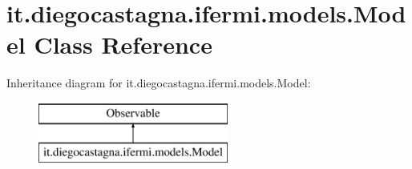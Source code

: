 \hypertarget{classit_1_1diegocastagna_1_1ifermi_1_1models_1_1_model}{}\section{it.\+diegocastagna.\+ifermi.\+models.\+Model Class Reference}
\label{classit_1_1diegocastagna_1_1ifermi_1_1models_1_1_model}
Inheritance diagram for it.\+diegocastagna.\+ifermi.\+models.\+Model\+:\begin{figure}[H]
\begin{center}
\leavevmode
\includegraphics[height=2.000000cm]{classit_1_1diegocastagna_1_1ifermi_1_1models_1_1_model}
\end{center}
\end{figure}
